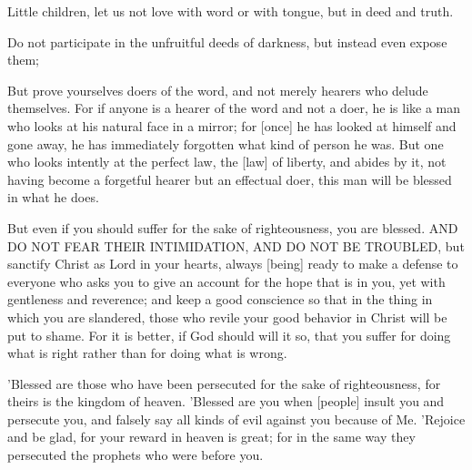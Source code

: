 \begin{scripture}[1 John 3:18]
    Little children, let us not love with word or with tongue, but in deed and truth.
\end{scripture}

\vspace{2\baselineskip}

\begin{scripture}[Ephesians 5:11]
    Do not participate in the unfruitful deeds of darkness, but instead even expose them;
\end{scripture}

\vspace{2\baselineskip}

\begin{scripture}[James 1:22-25]
    But prove yourselves doers of the word, and not merely hearers who delude themselves.
    For if anyone is a hearer of the word and not a doer, he is like a man who looks at his natural face in a mirror;
    for [once] he has looked at himself and gone away, he has immediately forgotten what kind of person he was.
    But one who looks intently at the perfect law, the [law] of liberty, and abides by it, not having become a forgetful hearer but an effectual doer, this man will be blessed in what he does.
\end{scripture}

\vspace{2\baselineskip}

\begin{scripture}[1 Peter 3:14-17]
    But even if you should suffer for the sake of righteousness, you are blessed. AND DO NOT FEAR THEIR INTIMIDATION, AND DO NOT BE TROUBLED,
    but sanctify Christ as Lord in your hearts, always [being] ready to make a defense to everyone who asks you to give an account for the hope that is in you, yet with gentleness and reverence;
    and keep a good conscience so that in the thing in which you are slandered, those who revile your good behavior in Christ will be put to shame.
    For it is better, if God should will it so, that you suffer for doing what is right rather than for doing what is wrong.
\end{scripture}

\vspace{2\baselineskip}

\begin{scripture}[Matthew 5:10-12]
    'Blessed are those who have been persecuted for the sake of righteousness, for theirs is the kingdom of heaven.
    'Blessed are you when [people] insult you and persecute you, and falsely say all kinds of evil against you because of Me.
    'Rejoice and be glad, for your reward in heaven is great; for in the same way they persecuted the prophets who were before you.
\end{scripture}

